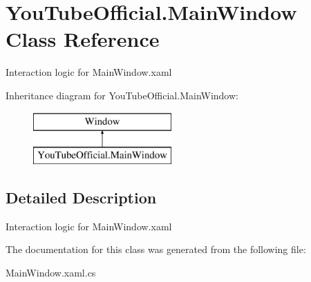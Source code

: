 \hypertarget{class_you_tube_official_1_1_main_window}{}\section{You\+Tube\+Official.\+Main\+Window Class Reference}
\label{class_you_tube_official_1_1_main_window}


Interaction logic for Main\+Window.\+xaml  


Inheritance diagram for You\+Tube\+Official.\+Main\+Window\+:\begin{figure}[H]
\begin{center}
\leavevmode
\includegraphics[height=2.000000cm]{class_you_tube_official_1_1_main_window}
\end{center}
\end{figure}


\subsection{Detailed Description}
Interaction logic for Main\+Window.\+xaml 



The documentation for this class was generated from the following file\+:\begin{DoxyCompactItemize}
\item 
Main\+Window.\+xaml.\+cs\end{DoxyCompactItemize}
